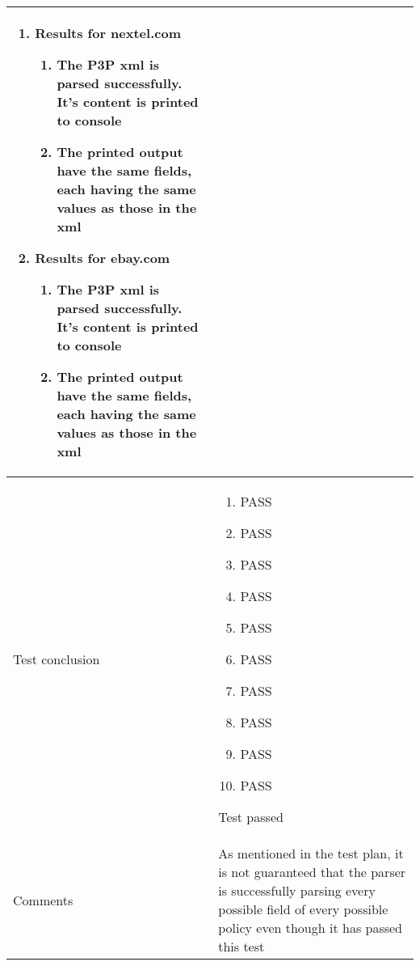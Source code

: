 \begin{center}
\begin{longtable}{ | p{4cm} | p{10cm} | }
\begin{enumerate}
							\item Results for nextel.com
							\begin{enumerate}
								\item The P3P xml is parsed successfully. It's content is printed to console
								\item The printed output have the same fields, each having the same values as those in the xml
							\end{enumerate}
					
							\item Results for ebay.com
							\begin{enumerate}
								\item The P3P xml is parsed successfully. It's content is printed to console
								\item The printed output have the same fields, each having the same values as those in the xml
							\end{enumerate}
						\end{enumerate}
							 \\  [3pt] \hline

			Test conclusion & 	\begin{enumerate}
							\item PASS
							\item PASS
							\item PASS
							\item PASS
							\item PASS
							\item PASS
							\item PASS
							\item PASS
							\item PASS
							\item PASS
						\end{enumerate}
						Test passed \\  [3pt] \hline
			Comments & As mentioned in the test plan, it is not guaranteed that the parser is successfully parsing every possible field of every possible policy even though it has passed this test
					\\ [3pt] \hline
		\end{longtable}
	\end{center}

